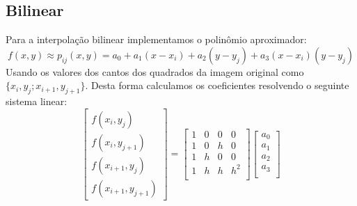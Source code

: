 \documentclass[12pt, a4paper]{article}
\begin{document}
\subsection*{Bilinear}
    Para a interpolação bilinear implementamos o polinômio aproximador:
    \begin{equation*}
        f(x,y) \approx p_{ij}(x,y) = a_{0} + a_{1}(x - x_{i}) +
        a_{2}(y - y_{j}) + a_{3}(x - x_{i})(y - y_{j})
    \end{equation*}
    Usando os valores dos cantos dos quadrados da imagem original como
    $\{x_i, y_j; x_{i+1}, y_{j+1}\}$. Desta forma calculamos os coeficientes resolvendo o seguinte sistema linear:
    \begin{equation*}
        \begin{bmatrix}
            f(x_i, y_j) \\
            f(x_i, y_{j+1}) \\
            f(x_{i+1}, y_j) \\
            f(x_{i+1}, y_{j+1})
        \end{bmatrix} =
        \begin{bmatrix}
            1 & 0 & 0 & 0 \\
            1 & 0 & h & 0 \\
            1 & h & 0 & 0 \\
            1 & h & h & h^2 \\
        \end{bmatrix}
        \begin{bmatrix}
            a_0 \\
            a_1 \\
            a_2 \\
            a_3 \\
        \end{bmatrix}
    \end{equation*}
\end{document}
